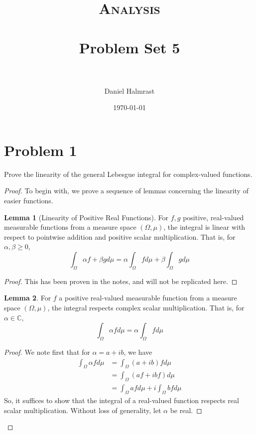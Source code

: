 \documentclass[fontsize=11pt]{scrartcl} %
\title{	
\normalfont \normalsize 
\textsc{Analysis} \\ [25pt] %
\horrule{0.5pt} \\[0.4cm] %
\huge Problem Set 5\\ %
\horrule{2pt} \\[0.5cm] %
}
\author{Daniel Halmrast} %
\date{\normalsize\today} %
\numberwithin{equation}{section} %
\numberwithin{figure}{section} %
\numberwithin{table}{section} %
\newcommand{\C}{\mathbb{C}}
\theoremstyle{definition}
\newtheorem{lemma}{Lemma}
\begin{document}
\maketitle %

\section*{Problem 1}
Prove the linearity of the general Lebesgue integral for complex-valued functions.
\\
\begin{proof}
To begin with, we prove a sequence of lemmas concerning the linearity of easier functions.
\begin{lemma}[Linearity of Positive Real Functions]
For $f,g$ positive, real-valued measurable functions from a measure space $(\Omega,\mu)$,
the integral is linear with respect to pointwise addition and positive scalar
multiplication. That is, for $\alpha, \beta \geq 0$,
\[
\int_{\Omega} \alpha f + \beta g d\mu = \alpha\int_{\Omega} fd\mu + \beta\int_{\Omega} gd\mu
\]
\end{lemma}
\begin{proof}
This has been proven in the notes, and will not be replicated here.
\end{proof}

\begin{lemma}
For $f$ a positive real-valued measurable function from a measure space $(\Omega,\mu)$,
the integral respects complex scalar multiplication. That is, for $\alpha\in\C$, 
\[
\int_{\Omega}\alpha fd\mu = \alpha\int_{\Omega} fd\mu
\]
\end{lemma}
\begin{proof}
We note first that for $\alpha=a+ib$, we have
\[
\begin{aligned}
\int_{\Omega}\alpha fd\mu   &= \int_{\Omega}(a+ib)fd\mu\\
                            &= \int_{\Omega}(af +ibf)d\mu\\
                            &= \int_{\Omega}afd\mu + i\int_{\Omega}bfd\mu
\end{aligned}
\]
So, it suffices to show that the integral of a real-valued function respects real
scalar multiplication. Without loss of generality, let $\alpha$ be real.


\end{proof}
\end{proof}
\end{document}

